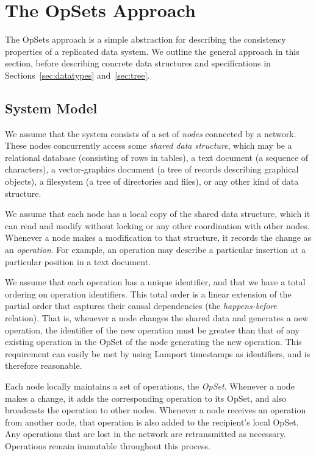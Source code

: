 \section{The OpSets Approach}\label{sec:approach}

The OpSets approach is a simple abstraction for describing the consistency properties of a replicated data system.
We outline the general approach in this section, before describing concrete data structures and specifications in Sections~\ref{sec:datatypes} and~\ref{sec:tree}.

\subsection{System Model}\label{sec:system-model}

We assume that the system consists of a set of \emph{nodes} connected by a network.
These nodes concurrently access some \emph{shared data structure}, which may be a relational database (consisting of rows in tables), a text document (a sequence of characters), a vector-graphics document (a tree of records describing graphical objects), a filesystem (a tree of directories and files), or any other kind of data structure.

We assume that each node has a local copy of the shared data structure, which it can read and modify without locking or any other coordination with other nodes.
Whenever a node makes a modification to that structure, it records the change as an \emph{operation}.
For example, an operation may describe a particular insertion at a particular position in a text document.

We assume that each operation has a unique identifier, and that we have a total ordering on operation identifiers.
This total order is a linear extension of the partial order that captures their causal dependencies (the \emph{happens-before} relation).
That is, whenever a node changes the shared data and generates a new operation, the identifier of the new operation must be greater than that of any existing operation in the OpSet of the node generating the new operation.
This requirement can easily be met by using Lamport timestamps \cite{Lamport:1978jq} as identifiers, and is therefore reasonable.

Each node locally maintains a set of operations, the \emph{OpSet}.
Whenever a node makes a change, it adds the corresponding operation to its OpSet, and also broadcasts the operation to other nodes.
Whenever a node receives an operation from another node, that operation is also added to the recipient's local OpSet.
Any operations that are lost in the network are retransmitted as necessary.
Operations remain immutable throughout this process.

